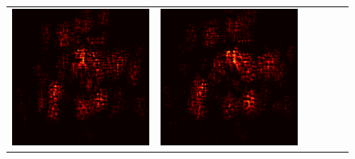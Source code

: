 \documentclass[preprint,12pt]{elsarticle}
\begin{document}
\begin{figure}[p]
\begin{tabular}{cccccc}
  \includegraphics[scale=\scale]{../visualizations/examples/imagenette/cnn/active_saliency_map/5.png} & 
  \includegraphics[scale=\scale]{../visualizations/examples/imagenette/cnn/inactive_saliency_map/5.png} \\
  

\end{tabular}
\end{figure}
\end{document}
